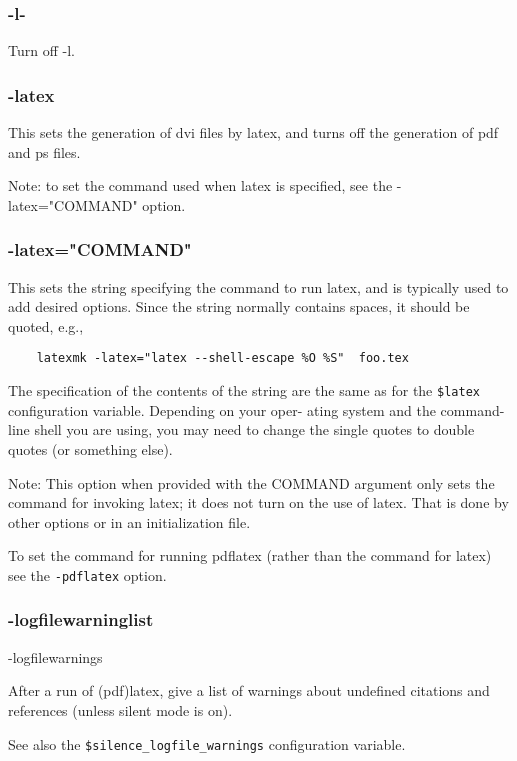 \subsubsection{-l-}

Turn off -l.


\subsubsection{-latex}

This  sets  the  generation of dvi files by latex, and turns off
the generation of pdf and ps files.

Note: to set the command used when latex is specified,  see  the
-latex="COMMAND" option.


\subsubsection{-latex="COMMAND"}

This sets the string specifying the command to run latex, and is typically used
to add desired options.  Since  the  string  normally contains spaces, it
should be quoted, e.g.,

\begin{verbatim}
	latexmk -latex="latex --shell-escape %O %S"  foo.tex
\end{verbatim}

The  specification of the contents of the string are the same as
for the \verb|$latex| configuration variable.  Depending on your  oper-
ating  system  and the command-line shell you are using, you may
need to change the single quotes to double quotes (or  something
else).

Note:  This  option when provided with the COMMAND argument only
sets the command for invoking latex; it does not turn on the use
of  latex. That is done by other options or in an initialization
file.

To set the command for running pdflatex (rather than the command
for latex) see the \verb|-pdflatex| option.


\subsubsection{-logfilewarninglist}
-logfilewarnings

After a run of (pdf)latex, give a list of warnings about undefined citations
and  references  (unless  silent mode is on).

See also the \verb|$silence_logfile_warnings| configuration variable.

